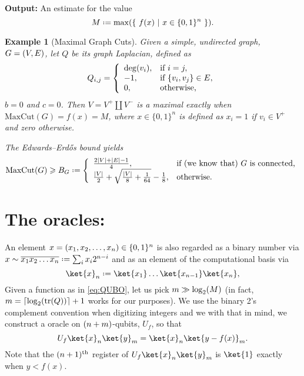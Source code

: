 \documentclass[reqno,oneside,12pt]{amsart}  %
\numberwithin{equation}{section}                %
\let\originalleft\left
\let\originalright\right
\renewcommand{\left}{\mathopen{}\mathclose\bgroup\originalleft}
\renewcommand{\right}{\aftergroup\egroup\originalright}
\def\({\mathopen{}\left(}
\def\){\right)\mathclose{}}
\newcommand*{\eqdef}{\mathrel{\vcenter{\baselineskip0.5ex \lineskiplimit0pt\hbox{.}\hbox{.}}}=}
\newtheorem{example}[theorem]{Example}
\def\tr{\mathrm{tr}}
\begin{document}
\smallskip

\noindent\textbf{Output:} An estimate for the value
\begin{equation}
   M \eqdef \max \( \left\{ \ f (x) \ \middle| \ x \in \{ 0, 1 \}^n \ \right\} \).
\end{equation}

\medskip

\begin{example}[Maximal Graph Cuts]
   Given a simple, undirected graph, $G = \( V, E \)$, let $Q$ be its graph Laplacian, defined as
   \begin{equation}
      Q_{i, j} = \left\{ \begin{array}{ll} \deg \( v_i \), & \mbox{if } i = j, \\ - 1, & \mbox{if } \{ v_i, v_j \} \in E, \\ 0, & \mbox{otherwise,} \end{array} \right.
   \end{equation}
   $b = 0$ and $c = 0$. Then $V = V^+ \coprod V^-$ is a maximal exactly when $\mathrm{MaxCut} (G) = f(x) = M$, where $x \in \{ 0, 1 \}^n$ is defined as $x_i = 1$ if $v_i \in V^+$ and zero otherwise.

   The Edwards--Erd\H{o}s bound yields
   \begin{equation}
      \mathrm{MaxCut} (G) \geqslant B_G \eqdef \left\{ \begin{array}{ll} \frac{2 |V| + |E| - 1}{4}, & \mbox{if (we know that) $G$ is connected,} \\ \frac{|V|}{2} + \sqrt{\tfrac{|V|}{8} + \tfrac{1}{64}} - \frac{1}{8}, & \mbox{otherwise.} \end{array} \right.
   \end{equation}
\end{example}

\bigskip

\section{The oracles:}

An element $x = \( x_1, x_2, \ldots, x_n \) \in \{ 0, 1 \}^n$ is also regarded as a binary number via $x \sim \overline{x_1 x_2 \ldots x_n} \eqdef \sum_i x_i 2^{n - i}$ and as an element of the computational basis via
\begin{equation}
   \ket{x}_n \eqdef \ket{x_1} \ldots \ket{x_{n - 1}} \ket{x_n},
\end{equation}
Given a function as in \cref{eq:QUBO}, let us pick $m \gg \log_2 \( M \)$ (in fact, $m = \left\lceil \log_2 \( \tr \( Q \) \) \right\rceil + 1$ works for our purposes). We use the binary 2’s complement convention when digitizing integers and we with that in mind, we construct a oracle on $\( n + m \)$-qubits, $U_f$, so that
\begin{equation}
   U_f \ket{x}_n \ket{y}_m = \ket{x}_n \ket{y - f (x)}_m.
\end{equation}
Note that the $\( n + 1 \)^{\mathrm{th}}$ register of $U_f \ket{x}_n \ket{y}_m$ is $\ket{1}$ exactly when $y < f (x)$.
\end{document}
